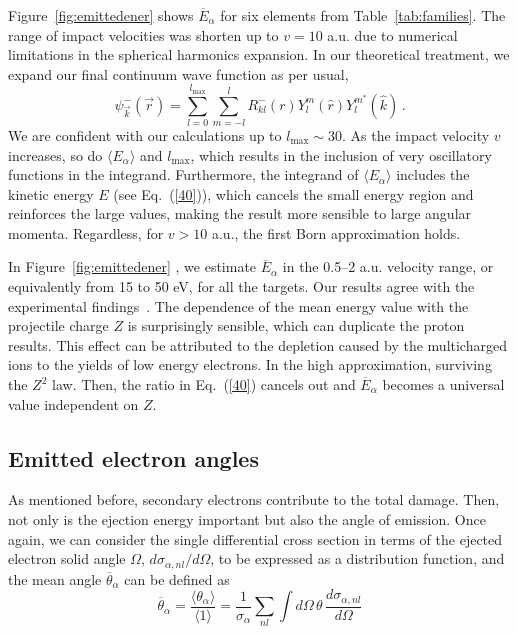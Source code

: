 \documentclass[preprint,12pt]{article}
\begin{document}
Figure~\ref{fig:emittedener} shows $\overline{E}_{\alpha}$ for six elements from 
Table~\ref{tab:families}. The range of impact velocities was shorten up 
to $v=10$ a.u. due to numerical limitations in the spherical harmonics 
expansion. In our theoretical treatment, we expand our final continuum 
wave function as per usual,
\begin{equation}
\psi_{\overrightarrow{k}}^{-}(\overrightarrow{r})=\sum_{l=0}^{l_{\max
}}\sum_{m=-l}^{l}R_{kl}^{-}(r)Y_{l}^{m}(\widehat{r})Y_{l}^{m^{\ast }}
(\widehat{k})\,.
\label{60}
\end{equation}
We are confident with our calculations up to $l_{\max}\sim 30$. 
As the impact velocity $v$ increases, so do $\langle E_{\alpha}\rangle$
and $l_{\max}$, which results in the inclusion of very oscillatory 
functions in the integrand. Furthermore, the integrand of
$\langle E_{\alpha}\rangle$ includes the kinetic energy $E$
(see Eq.~(\ref{40})), which cancels the small energy region and 
reinforces the large values, making the result more sensible to large
angular momenta. Regardless, for $v>10$ a.u., the first Born 
approximation holds.

In Figure~\ref{fig:emittedener} , we estimate $\overline{E}_{\alpha}$ 
in the 0.5--2 a.u.
velocity range, or equivalently from 15 to 50 eV, for all the targets.
Our results agree with the experimental findings~\cite{surdutovic2018}. 
The dependence of the mean energy value with the projectile charge $Z$ 
is surprisingly sensible, which can duplicate the proton results. 
This effect can be attributed to the depletion caused by the 
multicharged ions to the yields of low energy electrons. In the high 
approximation, surviving the $Z^{2}$ law. Then, the ratio in 
Eq.~(\ref{40}) cancels out and $\overline{E}_{\alpha}$ becomes a 
universal value independent on $Z$.

\subsection{Emitted electron angles}

As mentioned before, secondary electrons contribute to the total damage. 
Then, not only is the ejection energy important but also the angle 
of emission. Once again, we can consider the single differential cross 
section in terms of the ejected electron solid angle $\Omega$, 
$d\sigma_{\alpha,nl}/d\Omega$, to be expressed as a distribution function, 
and the mean angle $\overline{\theta}_{\alpha}$ can be defined as
\begin{equation}
\overline{\theta}_{\alpha}=\frac{\langle\theta_{\alpha}\rangle}
{\langle 1\rangle}=\frac{1}{\sigma_{\alpha}}\sum\limits_{nl}
\int d\Omega\,\theta\,\frac{d\sigma_{\alpha,nl}}{d\Omega}
\end{equation}
\end{document}
